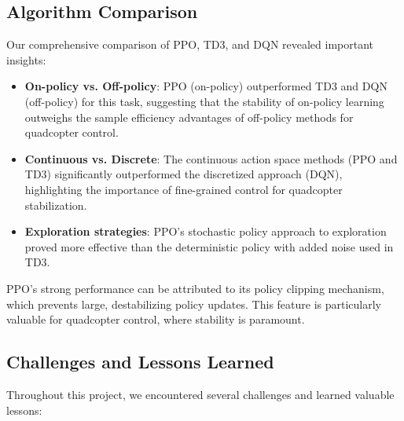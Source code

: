 \documentclass[12pt]{article}
\begin{document}
\subsection{Algorithm Comparison}

Our comprehensive comparison of PPO, TD3, and DQN revealed important insights:

\begin{itemize}
    \item \textbf{On-policy vs. Off-policy}: PPO (on-policy) outperformed TD3 and DQN (off-policy) for this task, suggesting that the stability of on-policy learning outweighs the sample efficiency advantages of off-policy methods for quadcopter control.
    
    \item \textbf{Continuous vs. Discrete}: The continuous action space methods (PPO and TD3) significantly outperformed the discretized approach (DQN), highlighting the importance of fine-grained control for quadcopter stabilization.
    
    \item \textbf{Exploration strategies}: PPO's stochastic policy approach to exploration proved more effective than the deterministic policy with added noise used in TD3.
\end{itemize}

PPO's strong performance can be attributed to its policy clipping mechanism, which prevents large, destabilizing policy updates. This feature is particularly valuable for quadcopter control, where stability is paramount.

\subsection{Challenges and Lessons Learned}

Throughout this project, we encountered several challenges and learned valuable lessons:
\end{document}
